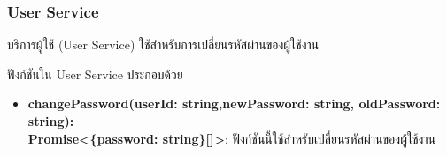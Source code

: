 \subsubsection{User Service}
\ifenglish
\else
บริการผู้ใช้ (User Service) ใช้สำหรับการเปลี่ยนรหัสผ่านของผู้ใช้งาน

ฟังก์ชันใน User Service ประกอบด้วย
\begin{itemize}
    \item \textbf{changePassword(userId: string,newPassword: string, oldPassword: string): \\ Promise<\{password: string\}[]>}: ฟังก์ชันนี้ใช้สำหรับเปลี่ยนรหัสผ่านของผู้ใช้งาน
\end{itemize}
\fi